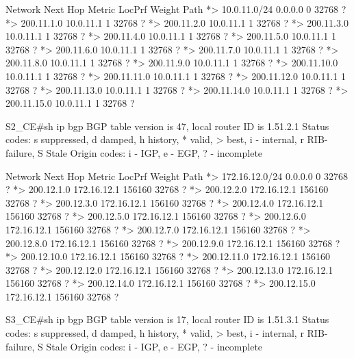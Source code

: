 \documentclass[10pt]{article}
\begin{document}
\begin{itemize}
\begin{verbatim*}
		   Network          Next Hop            Metric LocPrf Weight Path
		*> 10.0.11.0/24     0.0.0.0                  0         32768 ?
		*> 200.11.1.0       10.0.11.1                1         32768 ?
		*> 200.11.2.0       10.0.11.1                1         32768 ?
		*> 200.11.3.0       10.0.11.1                1         32768 ?
		*> 200.11.4.0       10.0.11.1                1         32768 ?
		*> 200.11.5.0       10.0.11.1                1         32768 ?
		*> 200.11.6.0       10.0.11.1                1         32768 ?
		*> 200.11.7.0       10.0.11.1                1         32768 ?
		*> 200.11.8.0       10.0.11.1                1         32768 ?
		*> 200.11.9.0       10.0.11.1                1         32768 ?
		*> 200.11.10.0      10.0.11.1                1         32768 ?
		*> 200.11.11.0      10.0.11.1                1         32768 ?
		*> 200.11.12.0      10.0.11.1                1         32768 ?
		*> 200.11.13.0      10.0.11.1                1         32768 ?
		*> 200.11.14.0      10.0.11.1                1         32768 ?
		*> 200.11.15.0      10.0.11.1                1         32768 ?


		S2_CE#sh ip bgp
		BGP table version is 47, local router ID is 1.51.2.1
		Status codes: s suppressed, d damped, h history, * valid, > best, i - internal,
		              r RIB-failure, S Stale
		Origin codes: i - IGP, e - EGP, ? - incomplete

		   Network          Next Hop            Metric LocPrf Weight Path
		*> 172.16.12.0/24   0.0.0.0                  0         32768 ?
		*> 200.12.1.0       172.16.12.1         156160         32768 ?
		*> 200.12.2.0       172.16.12.1         156160         32768 ?
		*> 200.12.3.0       172.16.12.1         156160         32768 ?
		*> 200.12.4.0       172.16.12.1         156160         32768 ?
		*> 200.12.5.0       172.16.12.1         156160         32768 ?
		*> 200.12.6.0       172.16.12.1         156160         32768 ?
		*> 200.12.7.0       172.16.12.1         156160         32768 ?
		*> 200.12.8.0       172.16.12.1         156160         32768 ?
		*> 200.12.9.0       172.16.12.1         156160         32768 ?
		*> 200.12.10.0      172.16.12.1         156160         32768 ?
		*> 200.12.11.0      172.16.12.1         156160         32768 ?
		*> 200.12.12.0      172.16.12.1         156160         32768 ?
		*> 200.12.13.0      172.16.12.1         156160         32768 ?
		*> 200.12.14.0      172.16.12.1         156160         32768 ?
		*> 200.12.15.0      172.16.12.1         156160         32768 ?


		S3_CE#sh ip bgp
		BGP table version is 17, local router ID is 1.51.3.1
		Status codes: s suppressed, d damped, h history, * valid, > best, i - internal,
		              r RIB-failure, S Stale
		Origin codes: i - IGP, e - EGP, ? - incomplete


\end{verbatim*}
\end{itemize}
\end{document}
